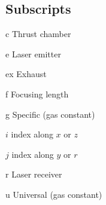 \begin{multicols*}{2}
    \section*{Subscripts}
    \begin{nomlist}
        \item[c]   Thrust chamber
        \item[e]   Laser emitter
        \item[ex]  Exhaust
        \item[f]   Focusing length
        \item[g]   Specific (gas constant)
        \item[$i$] index along $x$ or $z$
        \item[$j$] index along $y$ or $r$
        \item[r]   Laser receiver
        \item[u]   Universal (gas constant)
    \end{nomlist}


\end{multicols*}